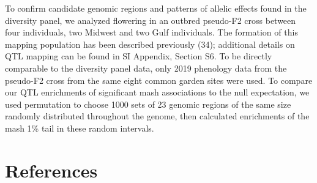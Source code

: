 \documentclass[
  9pt,
  twocolumn,
  twoside]{pnas-new}
\begin{document}
To confirm candidate genomic regions and patterns of allelic effects
found in the diversity panel, we analyzed flowering in an outbred
pseudo-F2 cross between four individuals, two Midwest and two Gulf
individuals. The formation of this mapping population has been described
previously (34); additional details on QTL mapping can be found in SI
Appendix, Section S6. To be directly comparable to the diversity panel
data, only 2019 phenology data from the pseudo-F2 cross from the same
eight common garden sites were used. To compare our QTL enrichments of
significant mash associations to the null expectation, we used
permutation to choose 1000 sets of 23 genomic regions of the same size
randomly distributed throughout the genome, then calculated enrichments
of the mash 1\% tail in these random intervals.

\section{References}\label{references}

\bibsplit[2]
\end{document}
